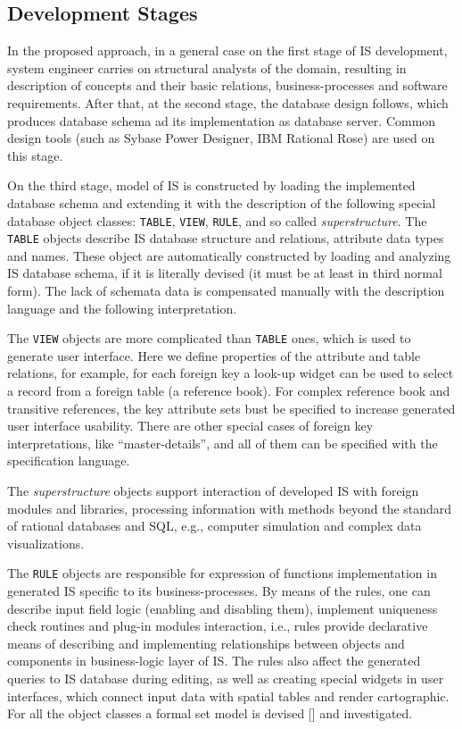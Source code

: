 \documentclass[conference]{IEEEtran}
\begin{document}
\subsection{Development Stages}
\label{sec:descr-synth-stag}

In the proposed approach, in a general case on the first stage of IS development, system engineer carries on structural analysts of the domain, resulting in description of concepts and their basic relations, business-processes and software requirements.  After that, at the second stage, the database design follows, which produces database schema ad its implementation as database server.  Common design tools (such as Sybase Power Designer, IBM Rational Rose) are used on this stage.

On the third stage, model of IS is constructed by loading the implemented database schema and extending it with the description of the following special database object classes: \texttt{TABLE}, \texttt{VIEW}, \texttt{RULE}, and so called \emph{superstructure}.  The \texttt{TABLE} objects describe IS database structure and relations, attribute data types and names.  These object are automatically constructed by loading and analyzing IS database schema, if it is literally devised (it must be at least in third normal form).  The lack of schemata data is compensated manually with the description language and the following interpretation.

The \texttt{VIEW} objects are more complicated than \texttt{TABLE} ones, which is used to generate user interface.  Here we define properties of the attribute and table relations, for example, for each foreign key a look-up widget can be used to select a record from a foreign table (a reference book).  For complex reference book and transitive references, the key attribute sets bust be specified to increase generated user interface usability.  There are other special cases of foreign key interpretations, like ``master-details'', and all of them can be specified with the specification language.

The \emph{superstructure} objects support interaction of developed IS with foreign modules and libraries, processing information with methods beyond the standard of rational databases and SQL, e.g., computer simulation and complex data visualizations.

The \texttt{RULE} objects are responsible for expression of functions implementation in generated IS specific to its business-processes.  By means of the rules, one can describe input field logic (enabling and disabling them), implement uniqueness check routines and plug-in modules interaction, i.e., rules provide declarative means of describing and implementing relationships between objects and components in business-logic layer of IS.  The rules also affect the generated queries to IS database during editing, as well as creating special widgets in user interfaces, which connect input data with spatial tables and render cartographic. For all the object classes a formal set model is devised [] and investigated.  %
\end{document}

